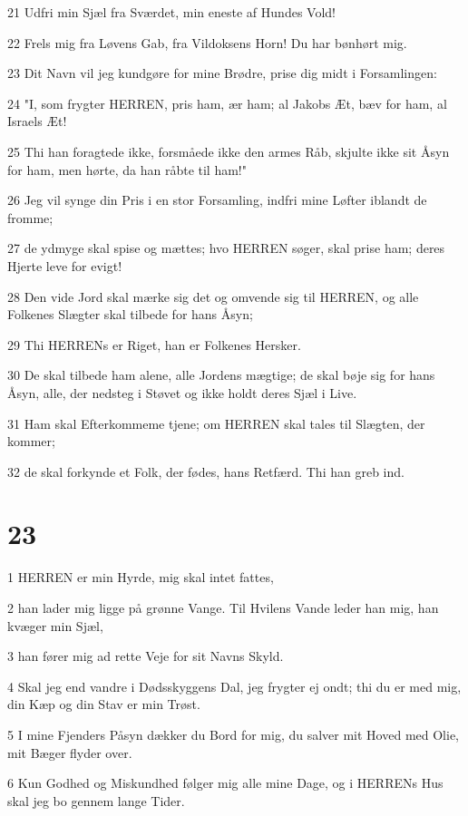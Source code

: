 \par 21 Udfri min Sjæl fra Sværdet, min eneste af Hundes Vold!
\par 22 Frels mig fra Løvens Gab, fra Vildoksens Horn! Du har bønhørt mig.
\par 23 Dit Navn vil jeg kundgøre for mine Brødre, prise dig midt i Forsamlingen:
\par 24 "I, som frygter HERREN, pris ham, ær ham; al Jakobs Æt, bæv for ham, al Israels Æt!
\par 25 Thi han foragtede ikke, forsmåede ikke den armes Råb, skjulte ikke sit Åsyn for ham, men hørte, da han råbte til ham!"
\par 26 Jeg vil synge din Pris i en stor Forsamling, indfri mine Løfter iblandt de fromme;
\par 27 de ydmyge skal spise og mættes; hvo HERREN søger, skal prise ham; deres Hjerte leve for evigt!
\par 28 Den vide Jord skal mærke sig det og omvende sig til HERREN, og alle Folkenes Slægter skal tilbede for hans Åsyn;
\par 29 Thi HERRENs er Riget, han er Folkenes Hersker.
\par 30 De skal tilbede ham alene, alle Jordens mægtige; de skal bøje sig for hans Åsyn, alle, der nedsteg i Støvet og ikke holdt deres Sjæl i Live.
\par 31 Ham skal Efterkommeme tjene; om HERREN skal tales til Slægten, der kommer;
\par 32 de skal forkynde et Folk, der fødes, hans Retfærd. Thi han greb ind.

\chapter{23}

\par 1 HERREN er min Hyrde, mig skal intet fattes,
\par 2 han lader mig ligge på grønne Vange. Til Hvilens Vande leder han mig, han kvæger min Sjæl,
\par 3 han fører mig ad rette Veje for sit Navns Skyld.
\par 4 Skal jeg end vandre i Dødsskyggens Dal, jeg frygter ej ondt; thi du er med mig, din Kæp og din Stav er min Trøst.
\par 5 I mine Fjenders Påsyn dækker du Bord for mig, du salver mit Hoved med Olie, mit Bæger flyder over.
\par 6 Kun Godhed og Miskundhed følger mig alle mine Dage, og i HERRENs Hus skal jeg bo gennem lange Tider.

